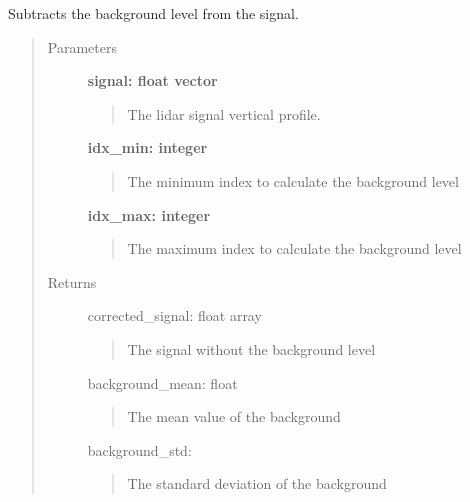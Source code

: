 \documentclass[letterpaper,10pt,english]{sphinxmanual}
\begin{document}
\begin{fulllineitems}
\label{pre_processing:pre_processing.subtract_background}
Subtracts the background level from the signal.
\begin{quote}\begin{description}
\item[{Parameters}] \leavevmode
\textbf{signal: float vector}
\begin{quote}

The lidar signal vertical profile.
\end{quote}

\textbf{idx\_min: integer}
\begin{quote}

The minimum index to calculate the background level
\end{quote}

\textbf{idx\_max: integer}
\begin{quote}

The maximum index to calculate the background level
\end{quote}

\item[{Returns}] \leavevmode
corrected\_signal: float array
\begin{quote}

The signal without the background level
\end{quote}

background\_mean: float
\begin{quote}

The mean value of the background
\end{quote}

background\_std:
\begin{quote}

The standard deviation of the background
\end{quote}

\end{description}\end{quote}

\end{fulllineitems}

\end{document}
